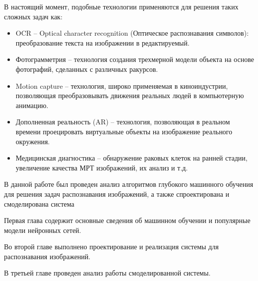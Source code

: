 В настоящий момент, подобные технологии применяются для решения таких сложных задач как:
\begin{itemize}
    \item OCR – Optical character recognition (Оптическое распознавания символов): преобразование текста на изображении в редактируемый.
    \item Фотограмметрия – технология создания трехмерной модели объекта на основе фотографий, сделанных с различных ракурсов.
    \item Motion capture – технология, широко применяемая в киноиндустрии, позволяющая преобразовывать движения реальных людей в компьютерную анимацию.
    \item Дополненная реальность (AR) – технология, позволяющая в реальном времени проецировать виртуальные объекты на изображение реального окружения. 
    \item Медицинская диагностика – обнаружение раковых клеток на ранней стадии, увеличение качества МРТ изображений, их анализ и т.д.
\end{itemize}

В данной работе был проведен анализ алгоритмов глубокого машинного обучения для решения задач распознавания изображений, а также спроектирована и смоделирована система 

Первая глава содержит основные сведения об машинном обучении и популярные модели нейронных сетей.

Во второй главе выполнено проектирование и реализация системы для распознавания изображений.

В третьей главе проведен анализ работы смоделированной системы.

\clearpage